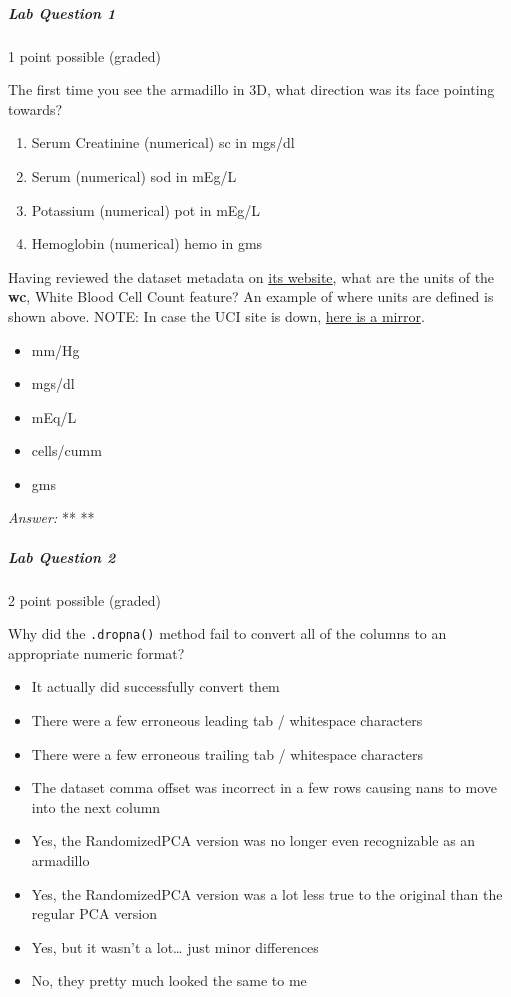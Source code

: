 \documentclass[11pt]{article}
\providecommand{\tightlist}{%
      \setlength{\itemsep}{0pt}\setlength{\parskip}{0pt}}
\begin{document}
\subparagraph{Lab Question 1}\label{lab-question-1-1}

1 point possible (graded)

The first time you see the armadillo in 3D, what direction was its face
pointing towards?

\begin{enumerate}
\def\labelenumi{\arabic{enumi}.}
\setcounter{enumi}{11}
\tightlist
\item
  Serum Creatinine (numerical) sc in mgs/dl
\item
  Serum (numerical) sod in mEg/L
\item
  Potassium (numerical) pot in mEg/L
\item
  Hemoglobin (numerical) hemo in gms
\end{enumerate}

Having reviewed the dataset metadata on
\href{https://archive.ics.uci.edu/ml/datasets/Chronic_Kidney_Disease}{its
website}, what are the units of the \textbf{wc}, White Blood Cell Count
feature? An example of where units are defined is shown above. NOTE: In
case the UCI site is down,
\href{http://mlr.cs.umass.edu/ml/datasets/Chronic_Kidney_Disease}{here
is a mirror}.

\begin{itemize}
\tightlist
\item
  mm/Hg
\item
  mgs/dl
\item
  mEq/L
\item
  cells/cumm
\item
  gms
\end{itemize}

\emph{Answer:} ** **

\subparagraph{Lab Question 2}\label{lab-question-2}

2 point possible (graded)

Why did the \texttt{.dropna()} method fail to convert all of the columns
to an appropriate numeric format?

\begin{itemize}
\item
  It actually did successfully convert them
\item
  There were a few erroneous leading tab / whitespace characters
\item
  There were a few erroneous trailing tab / whitespace characters
\item
  The dataset comma offset was incorrect in a few rows causing nans to
  move into the next column
\item
  Yes, the RandomizedPCA version was no longer even recognizable as an
  armadillo
\item
  Yes, the RandomizedPCA version was a lot less true to the original
  than the regular PCA version
\item
  Yes, but it wasn't a lot\ldots{} just minor differences
\item
  No, they pretty much looked the same to me
\end{itemize}
\end{document}
